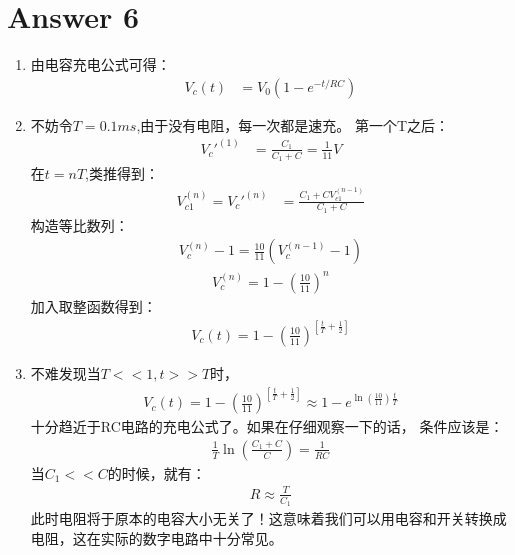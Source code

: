 \section*{Answer 6}
\begin{enumerate}
	\item 由电容充电公式可得：
	\begin{align*}
		V_c(t) &= V_0(1-e^{-t/RC}) 
	\end{align*}
	\item 不妨令\(T=0.1ms\),由于没有电阻，每一次都是速充。
	第一个T之后：
	\begin{align*}
		V_c'^{(1)} &= \frac{C_1}{C_1 + C} = \frac{1}{11} V
	\end{align*}
	在\(t=nT\),类推得到：
	\begin{align*}
		V_{c1}^{(n)}=V_c'^{(n)} &= \frac{C_1 +CV_{c1}^{(n-1)}}{C_1 + C}
	\end{align*}
	构造等比数列：
	\begin{align*}
		V_c^{(n)} - 1 = \frac{10}{11} (V_c^{(n-1)} - 1)
	\end{align*}
	\begin{align*}
		V_c^{(n)}=1- \left(\frac{10}{11}\right)^n
	\end{align*}
	加入取整函数得到：
	\begin{align*}
		V_c(t)=1- \left(\frac{10}{11}\right)^{[\frac{t}{T} + \frac{1}{2}]}
	\end{align*}
	\item 不难发现当\(T<<1,t>>T\)时，
	\begin{align*}
		V_c(t)=1- \left(\frac{10}{11}\right)^{[\frac{t}{T} + \frac{1}{2}]}\approx 1- e^{\ln(\frac{10}{11}) \frac{t}{T}}
	\end{align*}
	十分趋近于RC电路的充电公式了。如果在仔细观察一下的话，
	条件应该是：
	\begin{align*}
		\frac{1}{T}\ln(\frac{C_1+C}{C}) = \frac{1}{RC}
	\end{align*}
	当\(C_1<<C\)的时候，就有：
	\begin{align*}
		R \approx \frac{T}{C_1}
	\end{align*}
	此时电阻将于原本的电容大小无关了！这意味着我们可以用电容和开关转换成电阻，这在实际的数字电路中十分常见。


\end{enumerate}